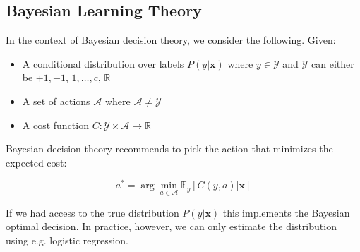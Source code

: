 \documentclass[a4paper,10pt,twoside]{article}
\begin{document}
\subsection{Bayesian Learning Theory}

In the context of Bayesian decision theory, we consider the following. Given:
\begin{itemize}
\item A conditional distribution over labels $P(y|\mathbf{x})$ where $y\in\mathcal{Y}$ and $\mathcal{Y}$ can either be ${+1,-1}$, ${1,\ldots, c}$, $\mathbb{R}$
\item A set of actions $\mathcal{A}$ where $\mathcal{A}\neq\mathcal{Y}$
\item A cost function $C:\mathcal{Y}\times\mathcal{A}\rightarrow\mathbb{R}$
\end{itemize}
Bayesian decision theory recommends to pick the action that minimizes the expected cost:

\begin{equation*}
  a^*= \arg\min_{a\in\mathcal{A}}\mathbb{E}_y[C(y,a)|\mathbf{x}]
\end{equation*}

If we had access to the true distribution $P(y|\mathbf{x})$ this implements the Bayesian optimal decision. In practice, however, we can only estimate the distribution using e.g. logistic regression.
\end{document}
